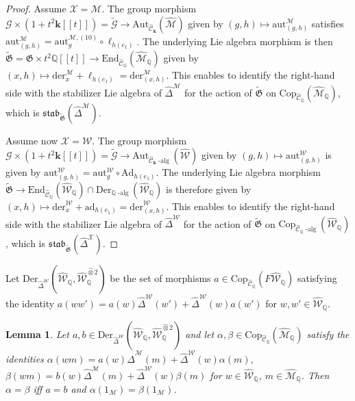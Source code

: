 \documentclass[10pt]{amsart}
\newtheorem{lem}[thm]{Lemma}
\numberwithin{equation}{subsection}
\begin{document}
\begin{proof} Assume $\mathcal X=\mathcal M$. The group morphism $\mathcal G\times(1+t^2\mathbf k[[t]])
={\tilde{\mathcal G}}\to \mathrm{Aut}_{\hat{\mathcal C}_{\mathbf k}}(\hat{\mathcal M})$ given by $(g,h)\mapsto \mathrm{aut}^{\mathcal M}_{(g,h)}$ 
satisfies $\mathrm{aut}^{\mathcal M}_{(g,h)}=\mathrm{aut}^{\mathcal M,(10)}_g\circ \ell_{h(e_1)}$. The underlying Lie algebra 
morphism is then $\tilde{\mathfrak G}=\mathfrak G\times t^2\mathbb Q[[t]]\to 
\mathrm{End}_{\hat{\mathcal C}_{\mathbb Q}}(\hat{\mathcal M}_{\mathbb Q})$ given by 
$(x,h)\mapsto \mathrm{der}_x^{\mathcal M}+\ell_{h(e_1)}=\mathrm{der}_{(x,h)}^{\mathcal M}$. 
This enables to identify the right-hand side with the stabilizer Lie algebra of 
$\hat\Delta^{\mathcal M}$ for the action of $\tilde{\mathfrak G}$ on 
$\mathrm{Cop}_{\hat{\mathcal C}_{\mathbb Q}}(\hat{\mathcal M}_{\mathbb Q})$, which is 
$\mathfrak{stab}_{\tilde{\mathfrak G}}(\hat\Delta^{\mathcal M})$. 

Assume now $\mathcal X=\mathcal W$. The group morphism $\mathcal G\times(1+t^2\mathbf k[[t]])={\tilde{\mathcal G}}\to 
\mathrm{Aut}_{\hat{\mathcal C}_{\mathbf k}\operatorname{-alg}}(\hat{\mathcal W})$ given by 
$(g,h)\mapsto \mathrm{aut}^{\mathcal W}_{(g,h)}$ is given by 
$\mathrm{aut}^{\mathcal W}_{(g,h)}=\mathrm{aut}^{\mathcal W}_g\circ \mathrm{Ad}_{h(e_1)}$. The underlying Lie algebra 
morphism $\tilde{\mathfrak G}\to \mathrm{End}_{\hat{\mathcal C}_{\mathbb Q}}(\hat{\mathcal W}_{\mathbb Q})\cap 
\mathrm{Der}_{\mathbb Q\operatorname{-alg}}(\hat{\mathcal W}_{\mathbb Q})$ is therefore given by 
$(x,h)\mapsto \mathrm{der}_x^{\mathcal W}+\mathrm{ad}_{h(e_1)}=\mathrm{der}_{(x,h)}^{\mathcal W}$. 
This enables to identify the right-hand side with the stabilizer Lie algebra of 
$\hat\Delta^{\mathcal W}$ for the action of $\tilde{\mathfrak G}$ on 
$\mathrm{Cop}_{\hat{\mathcal C}_{\mathbb Q}\operatorname{-alg}}(\hat{\mathcal W}_{\mathbb Q})$, 
which is $\mathfrak{stab}_{\tilde{\mathfrak G}}(\hat\Delta^{\mathcal X})$. 
\end{proof}

Let $\mathrm{Der}_{\hat\Delta^{\mathcal W}}(\hat{\mathcal W}_{\mathbb Q},\hat{\mathcal W}_{\mathbb Q}^{\hat\otimes 2})$ be the set of
morphisms $a\in \mathrm{Cop}_{\hat{\mathcal C}_{\mathbb Q}}(F\hat{\mathcal W}_{\mathbb Q})$ 
satisfying the identity $a(ww')=a(w)\hat\Delta^{\mathcal W}(w')+\hat\Delta^{\mathcal W}(w)a(w')$ for $w,w'\in\hat{\mathcal W}_{\mathbb Q}$.

\begin{lem}\label{toy:lemma:BIS}
Let $a,b\in \mathrm{Der}_{\hat\Delta^{\mathcal W}}(\hat{\mathcal W}_{\mathbb Q},\hat{\mathcal W}_{\mathbb Q}^{\hat\otimes 2})$ and let $\alpha,\beta\in \mathrm{Cop}_{\hat{\mathcal C}_{\mathbb Q}}(\hat{\mathcal M}_{\mathbb Q})$ 
satisfy the identities $\alpha(wm)=a(w)\hat\Delta^{\mathcal M}(m)+\hat\Delta^{\mathcal W}(w)\alpha(m)$, 
$\beta(wm)=b(w)\hat\Delta^{\mathcal M}(m)+\hat\Delta^{\mathcal W}(w)\beta(m)$ for $w\in\hat{\mathcal W}_{\mathbb Q}$, 
$m\in\hat{\mathcal M}_{\mathbb Q}$. Then $\alpha=\beta$ iff $a=b$ and $\alpha(1_{\mathcal M})=\beta(1_{\mathcal M})$. 
\end{lem}
\end{document}
